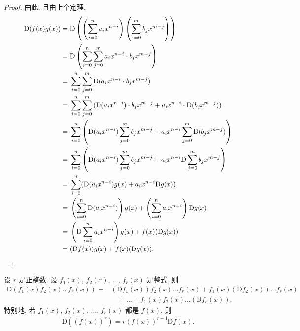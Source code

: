 \documentclass[../libro.tex]{subfiles}
\begin{document}
\begin{proof}
    由此, 且由上个定理,
    \begin{align*}
        \mathrm{D} (f(x) g(x))
        = {} &
        \mathrm{D} \left(
            \left(\sum_{i=0}^{n} {a_i x^{n-i}}\right)
            \left(\sum_{j=0}^{m} {b_j x^{m-j}}\right)
        \right)
        \\
        = {} &
        \mathrm{D} \left(
            \sum_{i=0}^{n} \sum_{j=0}^{m}
            {a_i x^{n-i} \cdot b_j x^{m-j}}
        \right)
        \\
        = {} &
        \sum_{i=0}^{n} \sum_{j=0}^{m}
        {\mathrm{D} (a_i x^{n-i} \cdot b_j x^{m-j})}
        \\
        = {} &
        \sum_{i=0}^{n} \sum_{j=0}^{m}
        {(\mathrm{D} (a_i x^{n-i}) \cdot b_j x^{m-j}
        + a_i x^{n-i} \cdot \mathrm{D} (b_j x^{m-j}))}
        \\
        = {} &
        \sum_{i=0}^{n}
        \left(
            \mathrm{D} (a_i x^{n-i}) \sum_{j=0}^{m} b_j x^{m-j}
            + a_i x^{n-i} \sum_{j=0}^{m} \mathrm{D} (b_j x^{m-j})
        \right)
        \\
        = {} &
        \sum_{i=0}^{n}
        \left(
            \mathrm{D} (a_i x^{n-i}) \sum_{j=0}^{m} b_j x^{m-j}
            + a_i x^{n-i} \mathrm{D} \sum_{j=0}^{m} b_j x^{m-j}
        \right)
        \\
        = {} &
        \sum_{i=0}^{n}
        ( \mathrm{D} (a_i x^{n-i}) g(x)
        + a_i x^{n-i} \mathrm{D} g(x))
        \\
        = {} &
        \left(
            \sum_{i=0}^{n} \mathrm{D} (a_i x^{n-i})
        \right) g(x)
        + \left(
            \sum_{i=0}^{n} a_i x^{n-i}
        \right) \mathrm{D} g(x)
        \\
        = {} &
        \left(\mathrm{D} \sum_{i=0}^{n} a_i x^{n-i}\right)
        g(x)
        + f(x) (\mathrm{D} g(x))
        \\
        = {} &
        (\mathrm{D} f(x)) g(x) + f(x) (\mathrm{D} g(x)).
        \qedhere
    \end{align*}
\end{proof}

\begin{theorem}
    设 \(r\) 是正整数.
    设 \(f_1 (x)\), \(f_2 (x)\), \(\dots\), \(f_r (x)\) 是整式.
    则
    \begin{align*}
        \mathrm{D} (f_1 (x) f_2 (x) \dots f_r (x))
        = {} &
        (\mathrm{D} f_1 (x)) f_2 (x) \dots f_r (x)
        + f_1 (x) (\mathrm{D} f_2 (x)) \dots f_r (x)
        \\
        &
        \quad
        + \dots
        + f_1 (x) f_2 (x) \dots (\mathrm{D} f_r (x)).
    \end{align*}
    特别地, 若 \(f_1 (x)\), \(f_2 (x)\), \(\dots\), \(f_r (x)\)
    都是 \(f(x)\),
    则
    \begin{align*}
        \mathrm{D} ((f(x))^r)
        = r (f(x))^{r-1} \mathrm{D} f(x).
    \end{align*}
\end{theorem}
\end{document}
